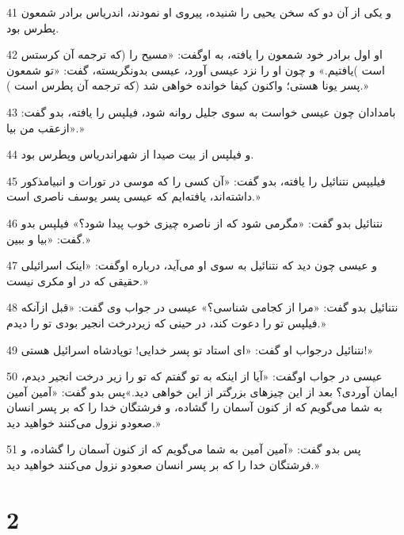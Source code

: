 \par 41 و یکی از آن دو که سخن یحیی را شنیده، پیروی او نمودند، اندریاس برادر شمعون پطرس بود.
\par 42 او اول برادر خود شمعون را یافته، به اوگفت: «مسیح را (که ترجمه آن کرستس است )یافتیم.» و چون او را نزد عیسی آورد، عیسی بدونگریسته، گفت: «تو شمعون پسر یونا هستی؛ واکنون کیفا خوانده خواهی شد (که ترجمه آن پطرس است ).»
\par 43 بامدادان چون عیسی خواست به سوی جلیل روانه شود، فیلپس را یافته، بدو گفت: «ازعقب من بیا.»
\par 44 و فیلپس از بیت صیدا از شهراندریاس وپطرس بود.
\par 45 فیلیپس نتنائیل را یافته، بدو گفت: «آن کسی را که موسی در تورات و انبیامذکور داشته‌اند، یافته‌ایم که عیسی پسر یوسف ناصری است.»
\par 46 نتنائیل بدو گفت: «مگرمی شود که از ناصره چیزی خوب پیدا شود؟» فیلپس بدو گفت: «بیا و ببین.»
\par 47 و عیسی چون دید که نتنائیل به سوی او می‌آید، درباره اوگفت: «اینک اسرائیلی حقیقی که در او مکری نیست.»
\par 48 نتنائیل بدو گفت: «مرا از کجامی شناسی؟» عیسی در جواب وی گفت: «قبل ازآنکه فیلپس تو را دعوت کند، در حینی که زیردرخت انجیر بودی تو را دیدم.»
\par 49 نتنائیل درجواب او گفت: «ای استاد تو پسر خدایی! توپادشاه اسرائیل هستی!»
\par 50 عیسی در جواب اوگفت: «آیا از اینکه به تو گفتم که تو را زیر درخت انجیر دیدم، ایمان آوردی؟ بعد از این چیزهای بزرگتر از این خواهی دید.»پس بدو گفت: «آمین آمین به شما می‌گویم که از کنون آسمان را گشاده، و فرشتگان خدا را که بر پسر انسان صعودو نزول می‌کنند خواهید دید.»
\par 51 پس بدو گفت: «آمین آمین به شما می‌گویم که از کنون آسمان را گشاده، و فرشتگان خدا را که بر پسر انسان صعودو نزول می‌کنند خواهید دید.»

\chapter{2}

